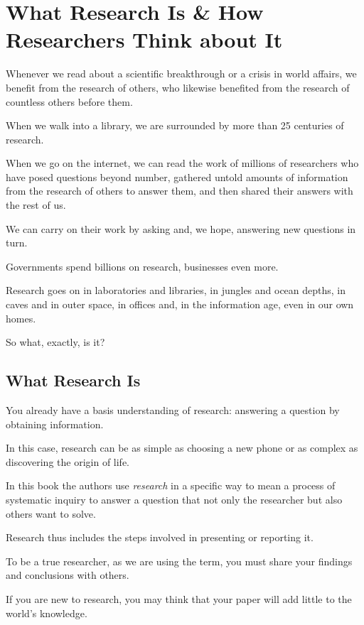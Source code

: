 \documentclass[oneside]{book}
\numberwithin{equation}{section}
\begin{document}
\chapter{What Research Is \& How Researchers Think about It}

Whenever we read about a scientific breakthrough or a crisis in world affairs, we benefit from the research of others, who likewise benefited from the research of countless others before them.

When we walk into a library, we are surrounded by more than 25 centuries of research.

When we go on the internet, we can read the work of millions of researchers who have posed questions beyond number, gathered untold amounts of information from the research of others to answer them, and then shared their answers with the rest of us.

We can carry on their work by asking and, we hope, answering new questions in turn.

Governments spend billions on research, businesses even more.

Research goes on in laboratories and libraries, in jungles and ocean depths, in caves and in outer space, in offices and, in the information age, even in our own homes.


%
So what, exactly, is it?

\section{What Research Is}
You already have a basis understanding of research: answering a question by obtaining information.

In this case, research can be as simple as choosing a new phone or as complex as discovering the origin of life.

In this book the authors use \textit{research} in a specific way to mean a process of systematic inquiry to answer a question that not only the researcher but also others want to solve.

Research thus includes the steps involved in presenting or reporting it.

To be a true researcher, as we are using the term, you must share your findings and conclusions with others.

%
If you are new to research, you may think that your paper will add little to the world's knowledge.
\end{document}
